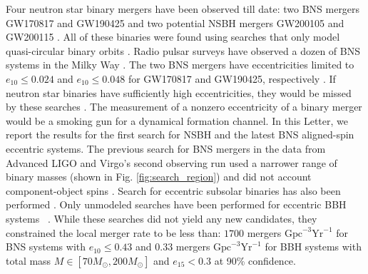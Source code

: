 \documentclass[floatfix,lengthcheck,showpacs,amssymb,amsmath,amsfonts,twocolumn,nofootinbib,longbibliography]{revtex4-1}
\begin{document}
Four neutron star binary mergers have been observed till date: two BNS mergers GW170817 \cite{LIGOScientific:2017vwq} and GW190425 \cite{LIGOScientific:2020aai} and two potential NSBH mergers GW200105 and GW200115 \cite{LIGOScientific:2021qlt}. All of these binaries were found using searches that only model quasi-circular binary orbits \cite{Messick:2016aqy,Aubin:2020goo,Allen:2005fk,Usman:2015kfa}. Radio pulsar surveys have observed a dozen of BNS systems in the Milky Way \cite{Tauris:2017omb,Ozel:2015fia}. The two BNS mergers have eccentricities limited to $e_{10} \leq 0.024$ and $e_{10} \leq 0.048$ for GW170817 and GW190425, respectively \cite{Lenon:2020oza}. If neutron star binaries have sufficiently high eccentricities, they would be missed by these searches \cite{Huerta:2013qb,Lenon:2021zac}. The measurement of a nonzero eccentricity of a binary merger would be a smoking gun for a dynamical formation channel. In this Letter, we report the results for the first search for NSBH and the latest BNS aligned-spin eccentric systems. The previous search for BNS mergers in the data from Advanced LIGO and Virgo's second observing run used a narrower range of binary masses (shown in Fig. \ref{fig:search_region}) and did not account component-object spins \cite{Nitz:2019spj}. Search for eccentric subsolar binaries has also been performed \cite{Nitz:2021vqh}. Only unmodeled searches have been performed for eccentric BBH systems ~\cite{LIGOScientific:2019dag, LIGOScientific:2023lpe}. While these searches did not yield any new candidates, they constrained the local merger rate to be less than: $1700$ mergers $\text{Gpc}^{-3} \text{Yr}^{-1}$ for BNS systems with $e_{10} \leq 0.43$ and $0.33$ mergers $\text{Gpc}^{-3} \text{Yr}^{-1}$ for BBH systems with total mass $M \in [70M_{\odot},200M_{\odot}]$ and $e_{15} < 0.3$ at 90\% confidence. 
\end{document}
